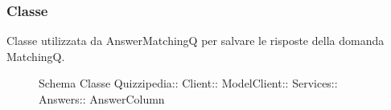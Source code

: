 \subsubsection{Classe }
Classe utilizzata da AnswerMatchingQ per salvare le risposte della domanda MatchingQ.
\begin{figure}[H]
\centering
\noindent{}
\caption[Schema Classe AnswerColumn]{Schema Classe Quizzipedia:: Client:: ModelClient:: Services:: Answers:: AnswerColumn}
\end{figure}

